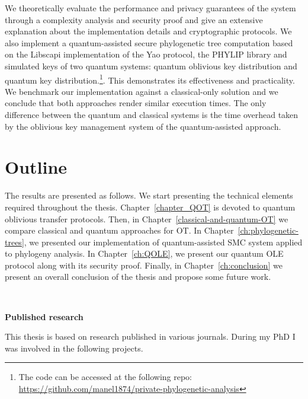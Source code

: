 We theoretically evaluate the performance and privacy guarantees of the system through a complexity analysis and security proof and give an extensive explanation about the implementation details and cryptographic protocols. We also implement a quantum-assisted secure phylogenetic tree computation based on the Libscapi implementation of the Yao protocol, the PHYLIP library and simulated keys of two quantum systems: quantum oblivious key distribution and quantum key distribution.\footnote{ The code can be accessed at the following repo: \href{https://github.com/manel1874/private-phylogenetic-analysis}{https://github.com/manel1874/private-phylogenetic-analysis}}. This demonstrates its effectiveness and practicality. We benchmark our implementation against a classical-only solution and we conclude that both approaches render similar execution times. The only difference between the quantum and classical systems is the time overhead taken by the oblivious key management system of the quantum-assisted approach.

\section*{Outline}

The results are presented as follows. We start presenting the technical elements required throughout the thesis. Chapter~\ref{chapter_QOT} is devoted to quantum oblivious transfer protocols. Then, in Chapter~\ref{classical-and-quantum-OT} we compare classical and quantum approaches for OT. In Chapter~\ref{ch:phylogenetic-trees}, we presented our implementation of quantum-assisted SMC system applied to phylogeny analysis. In Chapter~\ref{ch:QOLE}, we present our quantum OLE protocol along with its security proof. Finally, in Chapter~\ref{ch:conclusion} we present an overall conclusion of the thesis and propose some future work.


\

\noindent\textbf{Published research}

This thesis is based on research published in various journals. During my PhD I was involved in the following projects.

